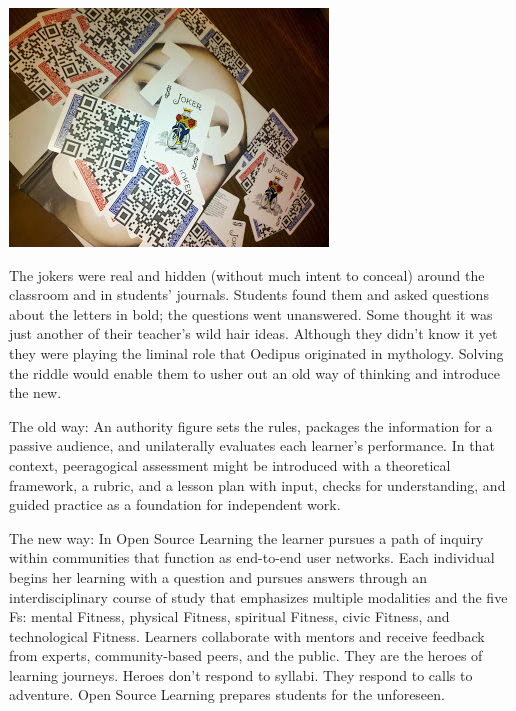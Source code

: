 {\centering
\includegraphics[width=.9\textwidth]{../pictures/jokers.jpg}\par}

The jokers were real and hidden (without much intent to conceal) around
the classroom and in students' journals. Students found them and asked
questions about the letters in bold; the questions went unanswered. Some
thought it was just another of their teacher's wild hair ideas. Although
they didn't know it yet they were playing the liminal role that Oedipus
originated in mythology. Solving the riddle would enable them to usher
out an old way of thinking and introduce the new.

The old way: An authority figure sets the rules, packages the
information for a passive audience, and unilaterally evaluates each
learner's performance. In that context, peeragogical assessment might be
introduced with a theoretical framework, a rubric, and a lesson plan
with input, checks for understanding, and guided practice as a
foundation for independent work.

The new way: In Open Source Learning the learner pursues a path of
inquiry within communities that function as end-to-end user networks.
Each individual begins her learning with a question and pursues answers
through an interdisciplinary course of study that emphasizes multiple
modalities and the five Fs: mental Fitness, physical Fitness, spiritual
Fitness, civic Fitness, and technological Fitness. Learners collaborate
with mentors and receive feedback from experts, community-based peers,
and the public. They are the heroes of learning journeys. Heroes don't
respond to syllabi. They respond to calls to adventure. Open Source
Learning prepares students for the unforeseen.

